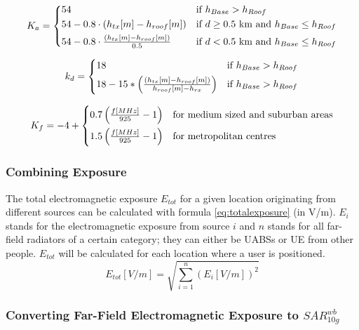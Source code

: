 \begin{equation}
K_{a}=
\begin{cases*}
    54                                                  & if $h_{Base}>h_{Roof} $\\
   54-0.8 \cdot (h_{tx}[m]-h_{roof}[m])                 & if $d \geq 0.5$ km and $h_{Base}\leq h_{Roof}$\\
    54-0.8 \cdot \frac{(h_{tx}[m]-h_{roof}[m])}{0.5}    & if $d < 0.5$ km and $h_{Base}\leq h_{Roof}$\\
  \end{cases*}
  \label{eq:walfish8}
\end{equation}

\begin{equation}
k_{d}=
\begin{cases*}
18 & if $h_{Base}>h_{Roof}$\\
 18-15 * \left( \frac{(h_{tx} [m] - h_{roof} [m])}{h_{roof}[m]- h_{rx}}  \right)  & if $h_{Base}>h_{Roof}$\\
  \end{cases*}
  \label{eq:walfish9}
\end{equation}

\begin{equation}
K_{f} = -4 + 
\begin{cases*}
  0.7\left(\frac{f [MHz]}{925}-1\right)  & for medium sized and suburban areas\cr 
  1.5\left(\frac{f [MHz]}{925}-1\right) & for metropolitan centres\cr 
\end{cases*}
\label{eq:walfish10}
\end{equation}



\subsubsection{Combining Exposure}
The total electromagnetic exposure $E_{tot}$ for a given location originating from different sources can be calculated with formula \ref{eq:totalexposure} (in V/m). $E_i$ stands for 
the electromagnetic exposure from source $i$ and
$n$ stands for all far-field radiators of a certain category; they can either be \gls{UABS}s or \gls{UE} from other people.
$E_{tot}$ will be calculated for each location where a user is positioned.  
\begin{equation}
E_{tot} [V/m] = \sqrt{\sum_{i=1}^{n} (E_i [V/m]) ^2}
\label{eq:totalexposure}
\end{equation}

\subsubsection{Converting Far-Field Electromagnetic Exposure to $SAR^{wb}_{10g}$}
\label{sub:convertDLtosarwb}

